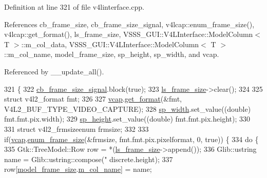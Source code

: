 Definition at line 321 of file v4linterface.\+cpp.



References cb\+\_\+frame\+\_\+size, cb\+\_\+frame\+\_\+size\+\_\+signal, v4lcap\+::enum\+\_\+frame\+\_\+size(), v4lcap\+::get\+\_\+format(), ls\+\_\+frame\+\_\+size, V\+S\+S\+S\+\_\+\+G\+U\+I\+::\+V4\+L\+Interface\+::\+Model\+Column$<$ T $>$\+::m\+\_\+col\+\_\+data, V\+S\+S\+S\+\_\+\+G\+U\+I\+::\+V4\+L\+Interface\+::\+Model\+Column$<$ T $>$\+::m\+\_\+col\+\_\+name, model\+\_\+frame\+\_\+size, sp\+\_\+height, sp\+\_\+width, and vcap.



Referenced by \+\_\+\+\_\+update\+\_\+all().


\begin{DoxyCode}
321                                               \{
322         \hyperlink{class_v_s_s_s___g_u_i_1_1_v4_l_interface_a1da538d681305543a819948f21eae6c2}{cb\_frame\_size\_signal}.block(\textcolor{keyword}{true});
323         \hyperlink{class_v_s_s_s___g_u_i_1_1_v4_l_interface_ac3e4431f229b53c83e35f5f400f4afee}{ls\_frame\_size}->clear();
324 
325         \textcolor{keyword}{struct }v4l2\_format fmt;
326 
327         \hyperlink{class_v_s_s_s___g_u_i_1_1_v4_l_interface_a7ece61f4ccc6d5321c445e60f34e7f33}{vcap}.\hyperlink{classv4lcap_aa5c521438e06e14625c05a02bafd35c1}{get\_format}(&fmt, V4L2\_BUF\_TYPE\_VIDEO\_CAPTURE);
328         \hyperlink{class_v_s_s_s___g_u_i_1_1_v4_l_interface_a0f492cb2c65c4021c9b9b81f4a185e84}{sp\_width}.set\_value((\textcolor{keywordtype}{double}) fmt.fmt.pix.width);
329         \hyperlink{class_v_s_s_s___g_u_i_1_1_v4_l_interface_a7b095a3a9dc7a5895f3bac68b05b8210}{sp\_height}.set\_value((\textcolor{keywordtype}{double}) fmt.fmt.pix.height);
330 
331         \textcolor{keyword}{struct }v4l2\_frmsizeenum frmsize;
332 
333         \textcolor{keywordflow}{if}(\hyperlink{class_v_s_s_s___g_u_i_1_1_v4_l_interface_a7ece61f4ccc6d5321c445e60f34e7f33}{vcap}.\hyperlink{classv4lcap_a6b806d7b2bfce38081f71fe01f380f6f}{enum\_frame\_size}(&frmsize, fmt.fmt.pix.pixelformat, 0, \textcolor{keyword}{true})) \{
334             \textcolor{keywordflow}{do} \{
335                 Gtk::TreeModel::Row row = *(\hyperlink{class_v_s_s_s___g_u_i_1_1_v4_l_interface_ac3e4431f229b53c83e35f5f400f4afee}{ls\_frame\_size}->append());
336                 Glib::ustring name = Glib::ustring::compose(\textcolor{stringliteral}{"%
      discrete.height);
337                 row[\hyperlink{class_v_s_s_s___g_u_i_1_1_v4_l_interface_a04efec56b83f5abf62316fd79ee5ef22}{model\_frame\_size}.\hyperlink{class_v_s_s_s___g_u_i_1_1_v4_l_interface_1_1_model_column_a96d5f652d19a139a1380d9ffc0110ed0}{m\_col\_name}] = name;
}
\end{DoxyCode}
